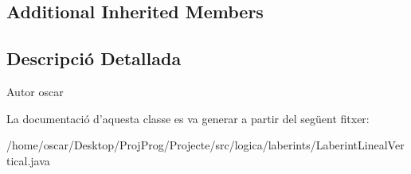 \subsection*{Additional Inherited Members}


\subsection{Descripció Detallada}
\begin{DoxyAuthor}{Autor}
oscar 
\end{DoxyAuthor}


La documentació d'aquesta classe es va generar a partir del següent fitxer\+:\begin{DoxyCompactItemize}
\item 
/home/oscar/\+Desktop/\+Proj\+Prog/\+Projecte/src/logica/laberints/Laberint\+Lineal\+Vertical.\+java\end{DoxyCompactItemize}
